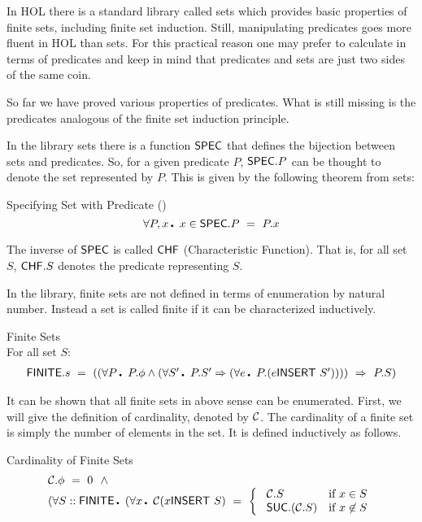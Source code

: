 In HOL there is a standard library called \code{}sets\edoc{} which provides
basic properties of finite sets, including finite set induction.
Still, manipulating predicates goes more fluent in HOL than sets. For
this practical reason one may prefer to calculate in terms of
predicates and keep in mind that predicates and sets are just two
sides of the same coin.

So far we have proved various properties of predicates. What is still
missing is the predicates analogous of the finite set induction
principle.

In the library \code{}sets\edoc{} there is a function ${\sf SPEC}$ that defines the
bijection between sets and predicates. So, for a given predicate $P$,
${\sf SPEC}.P$ can be thought to denote the set represented by $P$. This is
given by the following theorem from \code{}sets\edoc{}:

\begin{theorem}{Specifying Set with Predicate ()}
\[ \qA P,x\Dot x\in\SPEC.P \ = \ P.x \]
\end{theorem}

The inverse of ${\sf SPEC}$ is called ${\sf CHF}$ (Characteristic Function).
That is, for all set $S$, ${\sf CHF}.S$ denotes the predicate representing
$S$.

In the library, finite sets are not defined in terms of enumeration by
natural number. Instead a set is called finite if it can be
characterized inductively.

\begin{definition}{Finite Sets} \\
For all set $S$:
\[ \begin{array}{l}
   \Fin.s\ = \
   ((\qA P\Dot  P.\Empty \AND 
        (\qA S'\Dot P.S' \IMP (\qA e\Dot P.(e \INSERT S'))))
        \ \IMP \ P.S)
   \end{array} \]
\end{definition}

It can be shown that all finite sets in above sense can be enumerated.
First, we will give the definition of cardinality, denoted by ${\cal C}$.
The cardinality of a finite set is simply the number of elements in
the set. It is defined inductively as follows.

\begin{definition}{Cardinality of Finite Sets}
\[ \begin{array}{l}
    \CARD.\Empty\ =\ 0 \ \ \AND \\
    (\qA S::\Fin\Dot 
    (\qA x\Dot \CARD(x \INSERT S)\ = \
     \left\{ \ \begin{array}{ll} 
                 \CARD.S & \mbox{if $x\in S$} \\
                 \SUC.(\CARD.S) & \mbox{if $x\not\in S$}
               \end{array} 
     \right.
   \end{array} \]
\end{definition}

